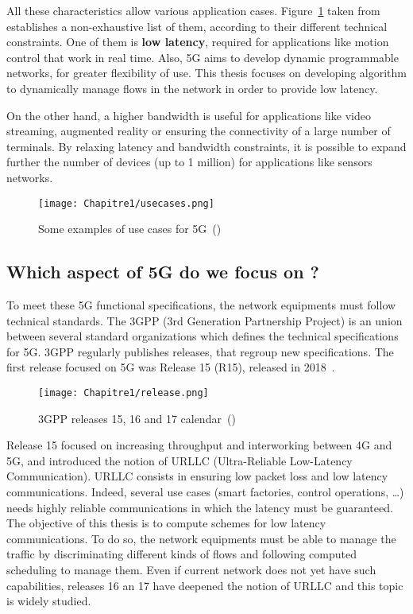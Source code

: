 All these characteristics allow various application cases. Figure~\ref{fig:usecases} taken from~\cite{5GACIA} establishes a non-exhaustive list of them, according to their different technical constraints. One of them is \textbf{low latency}, required for applications like motion control that work in real time. Also,  5G aims to develop dynamic programmable networks, for greater flexibility of use. This thesis focuses on developing algorithm to dynamically manage flows in the network in order to provide low latency.

On the other hand, a higher bandwidth is useful for applications like video streaming, augmented reality or ensuring the connectivity of a large number of terminals. By relaxing latency and bandwidth constraints, it is possible to expand further the number of devices (up to 1 million) for applications like sensors networks.

  \begin{figure}[h] 
      \begin{center}
      \texttt{[image: Chapitre1/usecases.png]}
      \end{center}
      \caption{Some examples of use cases for 5G~(\cite{5GACIA})}\label{fig:usecases}
      \end{figure}



\subsection{Which aspect of 5G do we focus on ?}


To meet these 5G functional specifications, the network equipments must follow technical standards. The 3GPP (3rd Generation Partnership Project) is an union between several standard organizations which defines the technical specifications for 5G. 3GPP regularly publishes releases, that regroup new specifications. The first release focused on 5G was Release 15 (R15), released in 2018~\cite{RELEASENOKIA}.  

  \begin{figure}[h]
      \begin{center}
      \texttt{[image: Chapitre1/release.png]}
      \end{center}
      \caption{3GPP releases 15, 16 and 17 calendar~(\cite{RELEASENOKIA})}\label{fig:release}
      \end{figure}
  

Release 15 focused on increasing throughput and interworking between 4G and 5G, and introduced the notion of URLLC (Ultra-Reliable Low-Latency Communication). URLLC consists in ensuring low packet loss and low latency communications. Indeed, several use cases (smart factories, control operations, \dots) needs highly reliable communications in which the latency must be guaranteed. 
The objective of this thesis is to compute schemes for low latency communications. To do so, the network equipments must be able to manage the traffic by discriminating different kinds of flows and following computed scheduling to manage them. Even if current network does not yet have such capabilities, releases 16 an 17 have deepened the notion of URLLC and this topic is widely studied. 

